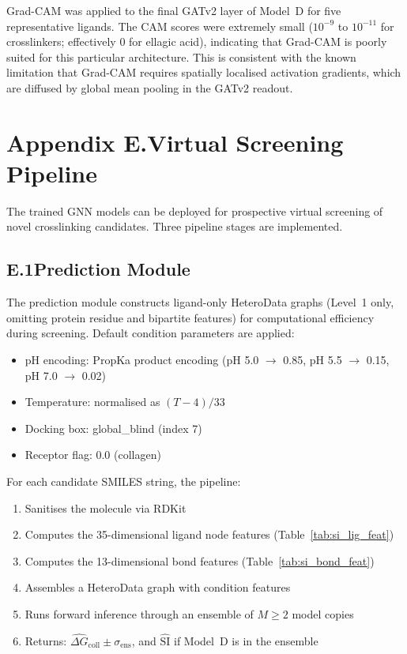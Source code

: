 \documentclass[11pt]{article}
\begin{document}
Grad-CAM was applied to the final GATv2 layer of Model~D for five
representative ligands.
The CAM scores were extremely small ($10^{-9}$ to $10^{-11}$ for
crosslinkers; effectively 0 for ellagic acid), indicating that
Grad-CAM is poorly suited for this particular architecture.
This is consistent with the known limitation that Grad-CAM requires
spatially localised activation gradients, which are diffused by
global mean pooling in the GATv2 readout.

\label{app:perligs_end}

\section*{Appendix E.\quad Virtual Screening Pipeline}
\label{app:screen}

The trained GNN models can be deployed for prospective virtual
screening of novel crosslinking candidates.
Three pipeline stages are implemented.

\subsection*{E.1\quad Prediction Module}

The prediction module constructs ligand-only HeteroData graphs
(Level~1 only, omitting protein residue and bipartite features)
for computational efficiency during screening.
Default condition parameters are applied:
\begin{itemize}[leftmargin=1.5em]
  \item pH encoding: PropKa product encoding
    (pH 5.0 $\to$ 0.85, pH 5.5 $\to$ 0.15, pH 7.0 $\to$ 0.02)
  \item Temperature: normalised as $(T - 4) / 33$
  \item Docking box: global\_blind (index 7)
  \item Receptor flag: 0.0 (collagen)
\end{itemize}

For each candidate SMILES string, the pipeline:
\begin{enumerate}[leftmargin=1.5em]
  \item Sanitises the molecule via RDKit
  \item Computes the 35-dimensional ligand node features (Table~\ref{tab:si_lig_feat})
  \item Computes the 13-dimensional bond features (Table~\ref{tab:si_bond_feat})
  \item Assembles a HeteroData graph with condition features
  \item Runs forward inference through an ensemble of $M \geq 2$
    model copies
  \item Returns: $\hat{\Delta G}_{\mathrm{coll}} \pm \sigma_{\mathrm{ens}}$,
    and $\hat{\text{SI}}$ if Model~D is in the ensemble
\end{enumerate}
\end{document}
